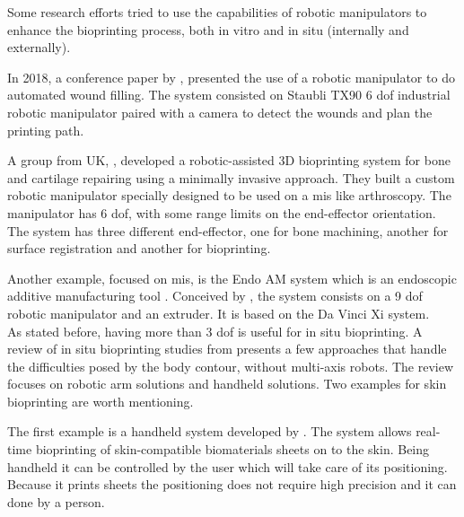 Some research efforts tried to use the capabilities of robotic manipulators to enhance the bioprinting process, both in vitro and in situ (internally and externally).

In 2018, a conference paper by \citeauthor{Jafari2018_robot_system_automated_wound_filling}\cite{Jafari2018_robot_system_automated_wound_filling}, presented the use of a robotic manipulator to do automated wound filling. The system consisted on Staubli TX90 6 \gls{dof} industrial robotic manipulator paired with a camera to detect the wounds and plan the printing path.

A group from UK, \citeauthor{Lipskas2019_robotic_assisted_3dbioprint_repairing_bone_cartilage}\cite{Lipskas2019_robotic_assisted_3dbioprint_repairing_bone_cartilage}, developed a robotic-assisted 3D bioprinting system for bone and cartilage repairing using a minimally invasive approach. They built a custom robotic manipulator specially designed to be used on a \gls{mis} like arthroscopy. The manipulator has 6 \gls{dof}, with some range limits on the end-effector orientation. The system has three different end-effector, one for bone machining, another for surface registration and another for bioprinting.

Another example, focused on \gls{mis}, is the Endo AM system which is an endoscopic additive manufacturing tool \cite{Simeunovic2019_endoscopic_additive_manufacturing}. Conceived by \citeauthor{Simeunovic2019_endoscopic_additive_manufacturing}, the system consists on a 9 \gls{dof} robotic manipulator and an extruder. It is based on the Da Vinci Xi system. \\

As stated before, having more than 3 \gls{dof} is useful for in situ bioprinting. A review of in situ bioprinting studies from \citeauthor{Singh2020a_in_situ_bioprinting}\cite{Singh2020a_in_situ_bioprinting} presents a few approaches that handle the difficulties posed by the body contour, without multi-axis robots. The review focuses on robotic arm solutions and handheld solutions. Two examples for skin bioprinting are worth mentioning.

The first example is a handheld system developed by \citeauthor{Hakimi2018_handheld_skin_printer}\cite{Hakimi2018_handheld_skin_printer}. The system allows real-time bioprinting of skin-compatible biomaterials sheets on to the skin. Being handheld it can be controlled by the user which will take care of its positioning. Because it prints sheets the positioning does not require high precision and it can done by a person.


